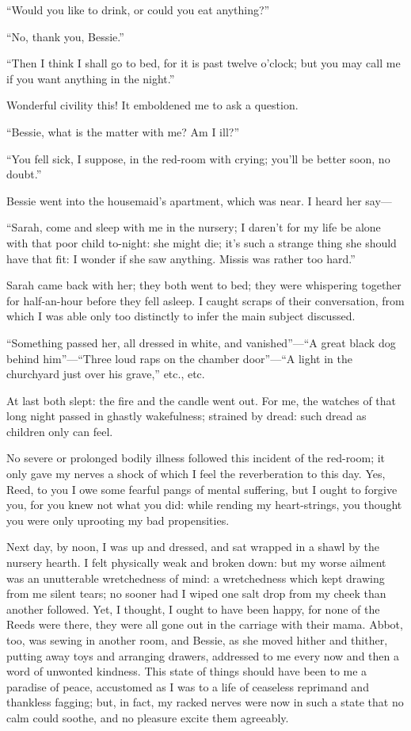 \enquote{Would you like to drink, or could you eat anything?}

\enquote{No, thank you, Bessie.}

\enquote{Then I think I shall go to bed, for it is past twelve o'clock;
but you may call me if you want anything in the night.}

Wonderful civility this!  It emboldened me to ask a question.

\enquote{Bessie, what is the matter with me?  Am I ill?}

\enquote{You fell sick, I suppose, in the red-room with crying; you'll
be better soon, no doubt.}

Bessie went into the housemaid's apartment, which was near.  I heard her
say---

\enquote{Sarah, come and sleep with me in the nursery; I daren't for my
life be alone with that poor child to-night: she might die; it's such a
strange thing she should have that fit: I wonder if she saw anything. 
Missis was rather too hard.}

Sarah came back with her; they both went to bed; they were whispering
together for half-an-hour before they fell asleep.  I caught scraps of
their conversation, from which I was able only too distinctly to infer
the main subject discussed.

\enquote{Something passed her, all dressed in white, and
vanished}---\enquote{A great black dog behind him}---\enquote{Three loud
raps on the chamber door}---\enquote{A light in the churchyard just over
his grave,} etc., etc.

At last both slept: the fire and the candle went out.  For me, the
watches of that long night passed in ghastly wakefulness; strained by
dread: such dread as children only can feel.

No severe or prolonged bodily illness followed this incident of the
red-room; it only gave my nerves a shock of which I feel the
reverberation to this day.  Yes, \Mrs{} Reed, to you I owe some fearful
pangs of mental suffering, but I ought to forgive you, for you knew not
what you did: while rending my heart-strings, you thought you were only
uprooting my bad propensities.

Next day, by noon, I was up and dressed, and sat wrapped in a shawl by
the nursery hearth.  I felt physically weak and broken down: but my
worse ailment was an unutterable wretchedness of mind: a wretchedness
which kept drawing from me silent tears; no sooner had I wiped one salt
drop from my cheek than another followed.  Yet, I thought, I ought to
have been happy, for none of the Reeds were there, they were all gone
out in the carriage with their mama.  Abbot, too, was sewing in another
room, and Bessie, as she moved hither and thither, putting away toys and
arranging drawers, addressed to me every now and then a word of unwonted
kindness.  This state of things should have been to me a paradise of
peace, accustomed as I was to a life of ceaseless reprimand and
thankless fagging; but, in fact, my racked nerves were now in such a
state that no calm could soothe, and no pleasure excite them agreeably.

